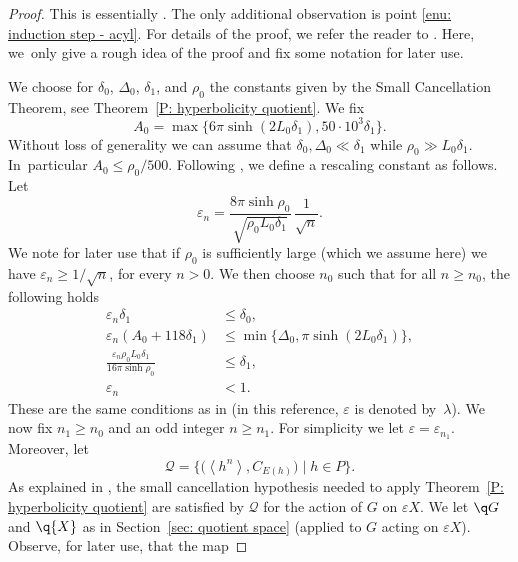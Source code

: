 \begin{proof}
This is essentially \cite[Prop.\,7.1]{coulon_geometry_2014}. The only additional observation is point \eqref{enu: induction step - acyl}. For details of the proof, we refer the reader to \cite{coulon_geometry_2014}.
Here, we~only give a rough idea of the proof and fix some notation for later use.

We choose for $\delta_0$, $\Delta_0$, $\delta_1$, and $\rho_0$ the constants given by the Small Cancellation Theorem, see Theorem~\ref{P: hyperbolicity quotient}.
We fix
\begin{equation*}
A_0 = \max\{6\pi \sinh(2L_0\delta_1), 50\cdot 10^3\delta_1\}.
\end{equation*}
Without loss of generality we can assume that $\delta_0, \Delta_0 \ll \delta_1$ while $\rho_0 \gg L_0\delta_1$.
In~particular $A_0 \leq \rho_0/500$.
Following \cite[pp.\,319]{coulon_geometry_2014}, we define a rescaling constant as follows. Let
\[
\varepsilon_n= \frac{8 \pi \sinh \rho_0 }{\sqrt{\rho_0 L_0 \delta_1}}\, \frac{1}{\sqrt{n}}.
\]
We note for later use that if $\rho_0$ is sufficiently large (which we assume here) we have $\varepsilon_n \geq 1/\sqrt n$, for every $n > 0$.
We then choose $n_0$ such that for all $n \geq n_0$, the following holds
\begin{align}
\varepsilon_n \delta_1 & \leq \delta_0, \\
\label{eqn: def epsilon}
\varepsilon_n (A_0 + 118\delta_1) & \leq \min\{ \Delta_0, \pi \sinh(2 L_0\delta_1)\}, \\
\frac{\varepsilon_n \rho_0L_0 \delta_1}{16 \pi \sinh \rho_0} & \leq \delta_1,\\
\varepsilon_n &< 1.
\end{align}
These are the same conditions as in \cite[p.\,319]{coulon_geometry_2014} (in this reference, $\varepsilon$ is denoted by~$\lambda$).
We now fix $n_1 \geq n_0$ and an odd integer $n \geq n_1$.
For simplicity we let $\varepsilon = \varepsilon_{n_1}$.
Moreover, let
\begin{equation*}
\mathcal Q=\bigl\{\bigl(\left<h^n\right>,C_{E(h)} \bigr)\mid h\in P \bigr\}.
\end{equation*}
As explained in \cite[Lem.\,7.2]{coulon_geometry_2014}, the small cancellation hypothesis needed to apply Theorem~\ref{P: hyperbolicity quotient} are satisfied by $\mathcal Q$ for the action of $G$ on $\varepsilon X$.
We let $\q G$ and $\q {X}$ as in Section~\ref{sec: quotient space} (applied to $G$ acting on $\varepsilon X$).
Observe, for later use, that the map

\end{proof}
